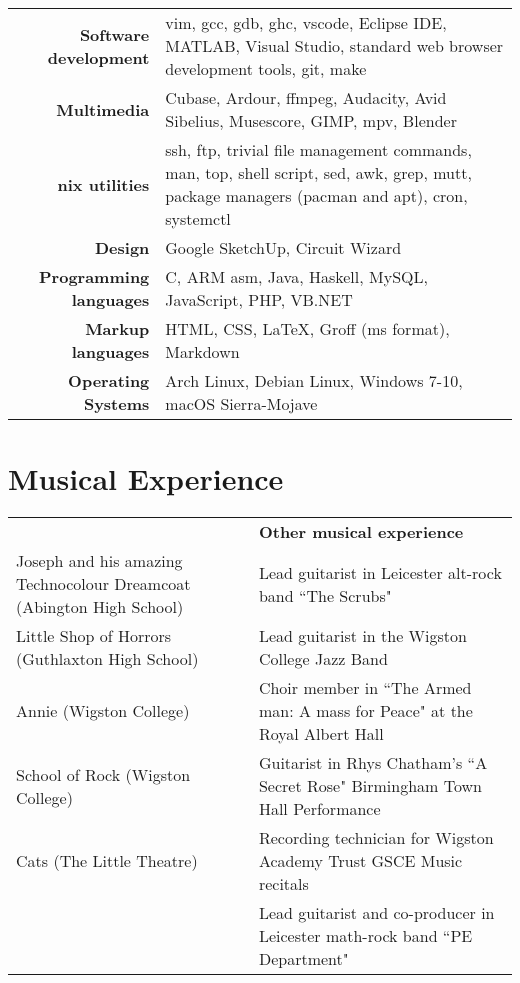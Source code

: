 \documentclass{article}
\begin{document}
{\renewcommand{\arraystretch}{2}

\begin{tabular}{ r | p{10cm} }

{\large\bfseries Software development} & {vim, gcc, gdb, ghc, vscode, Eclipse IDE, MATLAB, Visual Studio, standard web browser development tools, git, make}\\
{\large\bfseries Multimedia} & {Cubase, Ardour, ffmpeg, Audacity, Avid Sibelius, Musescore, GIMP, mpv, Blender} \\
{\large\bfseries *nix utilities} & {ssh, ftp, trivial file management commands, man, top, shell script, sed, awk, grep, mutt, package managers (pacman and apt), cron, systemctl} \\
{\large\bfseries Design} & {Google SketchUp, Circuit Wizard} \\
{\large\bfseries Programming languages} & {C, ARM asm, Java, Haskell, MySQL, JavaScript, PHP, VB.NET}\\
{\large\bfseries Markup languages} & {HTML, CSS, \LaTeX, Groff (ms format), Markdown}\\
{\large\bfseries Operating Systems} & {Arch Linux, Debian Linux, Windows 7-10, macOS Sierra-Mojave}\\


\end{tabular}

\section{Musical Experience}

{\renewcommand{\arraystretch}{1.4}

\begin{tabular}{>{\centering}p{} | >{\centering}p{} }
{\large\bfseries Shows as a pit-band guitarist} & {\large\bfseries Other musical experience}
\tabularnewline
Joseph and his amazing Technocolour Dreamcoat (Abington High School) & Lead guitarist in Leicester alt-rock band ``The Scrubs"
\tabularnewline
Little Shop of Horrors (Guthlaxton High School) & Lead guitarist in the Wigston College Jazz Band
\tabularnewline
Annie (Wigston College) & Choir member in ``The Armed man: A mass for Peace" at the Royal Albert Hall
\tabularnewline
School of Rock (Wigston College) & Guitarist in Rhys Chatham's ``A Secret Rose" Birmingham Town Hall Performance
\tabularnewline
Cats (The Little Theatre) & Recording technician for Wigston Academy Trust GSCE Music recitals
\tabularnewline
{} & Lead guitarist and co-producer in Leicester math-rock band ``PE Department"


\end{tabular}}}
\end{document}
